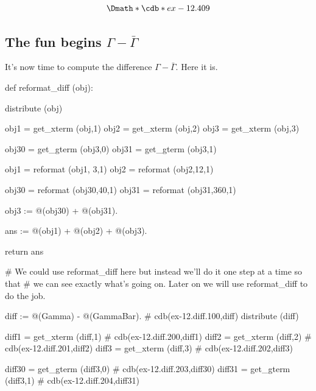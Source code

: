 \documentclass[12pt]{cdblatex}
\begin{document}
\clearpage

\begin{dgroup*}
   \Dmath*{\cdb*{ex-12.409}}
\end{dgroup*}

\clearpage

\def\GammaBar{{\bar{\Gamma}}}

\subsection*{The fun begins $\Gamma - \GammaBar$}

It's now time to compute the difference $\Gamma-\GammaBar$. Here it is.

\begin{cadabra}
   def reformat_diff (obj):

       distribute (obj)

       obj1  = get_xterm (obj,1)
       obj2  = get_xterm (obj,2)
       obj3  = get_xterm (obj,3)

       obj30 = get_gterm (obj3,0)
       obj31 = get_gterm (obj3,1)

       obj1  = reformat (obj1, 3,1)
       obj2  = reformat (obj2,12,1)

       obj30 = reformat (obj30,40,1)
       obj31 = reformat (obj31,360,1)

       obj3 := @(obj30) + @(obj31).

       ans := @(obj1) + @(obj2) + @(obj3).

       return ans

   # We could use reformat_diff here but instead we'll do it one step at a time so that
   # we can see exactly what's going on. Later on we will use reformat_diff to do the job.

   diff := @(Gamma) - @(GammaBar).                                # cdb(ex-12.diff.100,diff)
   distribute (diff)

   diff1  = get_xterm (diff,1)                                    # cdb(ex-12.diff.200,diff1)
   diff2  = get_xterm (diff,2)                                    # cdb(ex-12.diff.201,diff2)
   diff3  = get_xterm (diff,3)                                    # cdb(ex-12.diff.202,diff3)

   diff30 = get_gterm (diff3,0)                                   # cdb(ex-12.diff.203,diff30)
   diff31 = get_gterm (diff3,1)                                   # cdb(ex-12.diff.204,diff31)


\end{cadabra}
\end{document}
